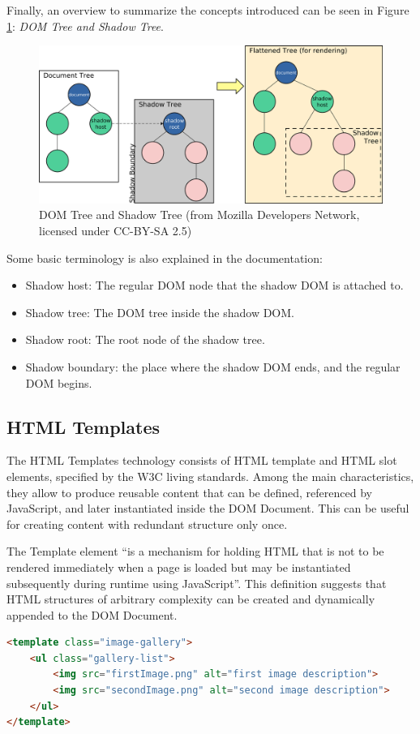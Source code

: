 Finally, an overview to summarize the concepts introduced can be seen in Figure \ref{fig:shadowDom}: \emph{DOM Tree and Shadow Tree}.

\begin{figure}[H]
\centering
\includegraphics[width=1\textwidth]{images/shadowdom.jpg}
\caption{DOM Tree and Shadow Tree (from Mozilla Developers Network, licensed under CC-BY-SA 2.5)}
\label{fig:shadowDom}
\end{figure}

Some basic terminology is also explained in the documentation:

\begin{itemize}
\item Shadow host: The regular DOM node that the shadow DOM is attached to.
\item Shadow tree: The DOM tree inside the shadow DOM.
\item Shadow root: The root node of the shadow tree.
\item Shadow boundary: the place where the shadow DOM ends, and the regular DOM begins.
\end{itemize}

\subsection{HTML Templates}
\label{subsec:HTMLTemplates}

The HTML Templates technology consists of HTML template and HTML slot elements, specified by the W3C living standards. Among the main characteristics, they allow to produce reusable content that can be defined, referenced by JavaScript, and later instantiated inside the DOM Document. This can be useful for creating content with redundant structure only once.

The Template element “is a mechanism for holding HTML that is not to be rendered immediately when a page is loaded but may be instantiated subsequently during runtime using JavaScript”. This definition suggests that HTML structures of arbitrary complexity can be created and dynamically appended to the DOM Document.
\\
\begin{lstlisting}[caption={HTML Template creation},label={htmlTemplate}, language=HTML]
<template class="image-gallery">
    <ul class="gallery-list">
        <img src="firstImage.png" alt="first image description">
        <img src="secondImage.png" alt="second image description">
    </ul>
</template>
\end{lstlisting}

